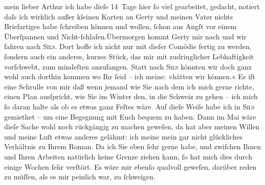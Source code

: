 \pstart{}mein lieber Arthur\pend\vspace{0.5em}
\pstart
           ich habe dieſe 14 Tage hier ſo viel gearbeitet, gedacht, notiert daſs ich wirklich
               außer kleinen Karten an Gerty und meinen Vater nichts Briefartiges
               habe ſchreiben können und wollen, ſchon aus Angſt vor einem Überſpannen und
                  Nicht-ſchlafen.\hspace*{1.5em}Übermorgen kommt Gerty mir nach und {\pb}wir fahren nach \textsc{Sils}. Dort hoffe ich nicht nur mit dieſer Comödie fertig zu werden, ſondern auch ein anderes, kurzes
                  Stück, das mir
               mit zudringlicher Lebhaftigkeit vorſchwebt, zum mindeſten anzufangen. \hspace*{1.5em}Statt nach \textsc{Sils} könnten wir doch ganz wohl auch dorthin kommen wo {\pb}Ihr ſeid – ich meine: »hätten wir
               können.« Es iſt eine Schrulle von mir daß wenn jemand wie Sie nach dem ich mich gerne
               richte, einen Plan ausſpricht, wie Sie im Winter den, in die Schweiz zu gehen – ich mich ſo daran halte als ob es etwas ganz
               Feſtes wäre. Auf dieſe Weiſe habe ich in \textsc{Sils} gemiethet – um eine Begegnung mit Euch {\pb}bequem zu haben. Dann im
                  Mai wäre dieſe Sache wohl noch rückgängig zu machen geweſen, da hat
               aber meinen Willen und meine Luſt etwas anderes gelähmt: ich meine mein gar nicht
               glückliches Verhältnis zu Ihrem Roman. Da ich Sie eben ſehr gerne habe, und zwiſchen Ihnen und Ihren
               Arbeiten natürlich keine Grenze ziehen kann, ſo hat mich dies {\pb}durch einige Wochen ſehr verſtört.
               Es wäre mir ebenſo qualvoll geweſen, darüber reden zu müſſen, als es mir peinlich
               war,  zu ſchweigen.\pend
           
